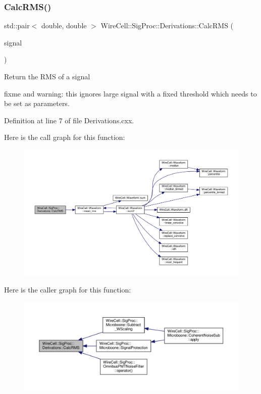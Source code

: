 \subsubsection{\texorpdfstring{Calc\+R\+M\+S()}{CalcRMS()}}
{\footnotesize\ttfamily std\+::pair$<$ double, double $>$ Wire\+Cell\+::\+Sig\+Proc\+::\+Derivations\+::\+Calc\+R\+MS (\begin{DoxyParamCaption}\item[{const \hyperlink{namespace_wire_cell_1_1_waveform_a479175e541c8545e87cd8063b74b6956}{Wire\+Cell\+::\+Waveform\+::realseq\+\_\+t} \&}]{signal }\end{DoxyParamCaption})}

Return the R\+MS of a signal

fixme and warning\+: this ignores large signal with a fixed threshold which needs to be set as parameters. 

Definition at line 7 of file Derivations.\+cxx.

Here is the call graph for this function\+:
\nopagebreak
\begin{figure}[H]
\begin{center}
\leavevmode
\includegraphics[width=350pt]{namespace_wire_cell_1_1_sig_proc_1_1_derivations_a3119f257567050bd02427bbcd2cd3a7b_cgraph}
\end{center}
\end{figure}
Here is the caller graph for this function\+:
\nopagebreak
\begin{figure}[H]
\begin{center}
\leavevmode
\includegraphics[width=350pt]{namespace_wire_cell_1_1_sig_proc_1_1_derivations_a3119f257567050bd02427bbcd2cd3a7b_icgraph}
\end{center}
\end{figure}
